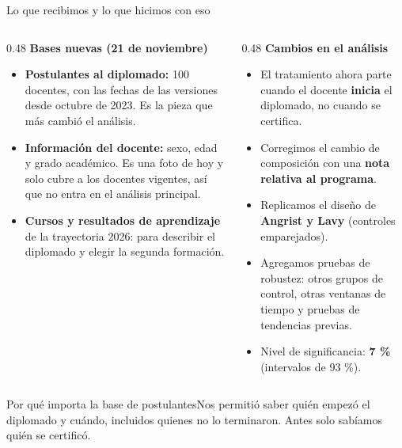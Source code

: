 \documentclass[10pt,aspectratio=169]{beamer}
\newcommand{\sintesis}[2]{%
  \begin{block}{#1}#2\end{block}}
\begin{document}
\begin{frame}{Lo que recibimos y lo que hicimos con eso}
  \begin{columns}[T]
    \begin{column}{0.48\textwidth}
      \textbf{Bases nuevas (21 de noviembre)}
      \begin{itemize}\small
        \item \textbf{Postulantes al diplomado:} 100 docentes, con las fechas de las versiones desde octubre de 2023. Es la pieza que más cambió el análisis.
        \item \textbf{Información del docente:} sexo, edad y grado académico. Es una foto de hoy y solo cubre a los docentes vigentes, así que no entra en el análisis principal.
        \item \textbf{Cursos y resultados de aprendizaje} de la trayectoria 2026: para describir el diplomado y elegir la segunda formación.
      \end{itemize}
    \end{column}
    \begin{column}{0.48\textwidth}
      \textbf{Cambios en el análisis}
      \begin{itemize}\small
        \item El tratamiento ahora parte cuando el docente \textbf{inicia} el diplomado, no cuando se certifica.
        \item Corregimos el cambio de composición con una \textbf{nota relativa al programa}.
        \item Replicamos el diseño de \textbf{Angrist y Lavy} (controles emparejados).
        \item Agregamos pruebas de robustez: otros grupos de control, otras ventanas de tiempo y pruebas de tendencias previas.
        \item Nivel de significancia: \textbf{7 \%} (intervalos de 93 \%).
      \end{itemize}
    \end{column}
  \end{columns}
  \vspace{0.4em}
  \sintesis{Por qué importa la base de postulantes}{Nos permitió saber quién empezó el diplomado y cuándo, incluidos quienes no lo terminaron. Antes solo sabíamos quién se certificó.}
\end{frame}
\end{document}
